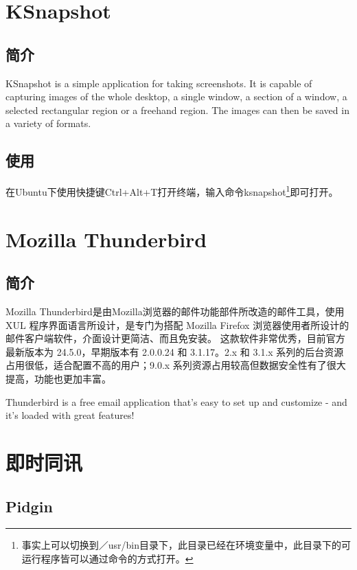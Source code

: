 \documentclass[paper=a4,fontsize=11pt]{article}
\begin{document}
			
	
	\section{KSnapshot}
	
	\subsection{简介}
	
	KSnapshot is a simple application for taking screenshots. It is capable of capturing images of the whole desktop, a single window, a section of a window, a selected rectangular region or a freehand region. The images can then be saved in a variety of formats.
	
	\subsection{使用}	
	
	在Ubuntu下使用快捷键Ctrl+Alt+T打开终端，输入命令ksnapshot\footnote{事实上可以切换到／usr/bin目录下，此目录已经在环境变量中，此目录下的可运行程序皆可以通过命令的方式打开。}即可打开。
	

	
	\section{Mozilla Thunderbird}
	
	\subsection{简介}
	
	Mozilla Thunderbird是由Mozilla浏览器的邮件功能部件所改造的邮件工具，使用 XUL 程序界面语言所设计，是专门为搭配 Mozilla Firefox 浏览器使用者所设计的邮件客户端软件，介面设计更简洁、而且免安装。 这款软件非常优秀，目前官方最新版本为 24.5.0，早期版本有 2.0.0.24 和 3.1.17。2.x 和 3.1.x 系列的后台资源占用很低，适合配置不高的用户；9.0.x 系列资源占用较高但数据安全性有了很大提高，功能也更加丰富。
	
	Thunderbird is a free email application that's easy to set up and customize - and it's loaded with great features!
	
	\section{即时同讯}	
	
	\subsection{Pidgin}	
	
\end{document}
